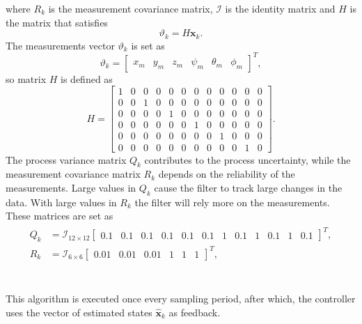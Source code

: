 where $R_k$ is the measurement covariance matrix, $\mathcal{I}$ is the identity matrix and $H$ is the matrix that satisfies
\begin{equation}
\vartheta_k = H \mathbf{x}_k.
\end{equation}
The measurements vector $\vartheta_k$ is set as
\begin{equation}
\vartheta_k = \begin{bmatrix}
x_{m} & y_{m} & z_{m} & \psi_{m} & \theta_{m} & \phi_{m}
\end{bmatrix}^{T},
\end{equation}
so matrix $H$ is defined as
\begin{equation}\label{eqn:H}
H =\begin{bmatrix}
1 & 0 & 0 & 0 & 0 & 0 & 0 & 0 & 0 & 0 & 0 & 0\\
0 & 0 & 1 & 0 & 0 & 0 & 0 & 0 & 0 & 0 & 0 & 0\\
0 & 0 & 0 & 0 & 1 & 0 & 0 & 0 & 0 & 0 & 0 & 0\\
0 & 0 & 0 & 0 & 0 & 0 & 1 & 0 & 0 & 0 & 0 & 0\\
0 & 0 & 0 & 0 & 0 & 0 & 0 & 0 & 1 & 0 & 0 & 0\\
0 & 0 & 0 & 0 & 0 & 0 & 0 & 0 & 0 & 0 & 1 & 0
			\end{bmatrix}.
\end{equation}
The process variance matrix $Q_k$ contributes to the process uncertainty, while the measurement covariance matrix $R_k$ depends on the reliability of the measurements. Large values in $Q_k$ cause the filter to track large changes in the data. With large values in $R_k$ the filter will rely more on the measurements. These matrices are set as
\begin{align}
\label{eqn:QR_kalman}
\begin{split}
Q_k & = \mathcal{I}_{12 \times 12}\begin{bmatrix}
0.1 & 0.1 & 0.1 & 0.1 & 0.1 & 0.1 & 1 & 0.1 & 1 & 0.1 & 1 & 0.1 \end{bmatrix}^{T},\\
R_k & = \mathcal{I}_{6 \times 6}\begin{bmatrix}
0.01 & 0.01 & 0.01 & 1 & 1 & 1
\end{bmatrix}^{T},
\end{split}
\end{align} 
\\\\
This algorithm is executed once every sampling period, after which, the controller uses the vector of estimated states $\hat{\mathbf{x}}_{k}$ as feedback.



